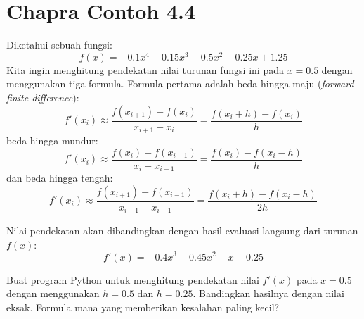 \section{Chapra Contoh 4.4}
Diketahui sebuah fungsi:
\begin{equation}
f(x) = -0.1x^4 - 0.15x^3 - 0.5x^2 - 0.25x + 1.25
\end{equation}
Kita ingin menghitung pendekatan nilai turunan fungsi ini pada $x=0.5$ dengan menggunakan tiga formula.
Formula pertama adalah beda hingga maju (\textit{forward finite difference}):
\begin{equation}
f'(x_{i}) \approx \frac{f(x_{i+1}) - f(x_{i})}{x_{i+1} - x_{i}} =
\frac{f(x_{i}+h) - f(x_{i})}{h}
\end{equation}
beda hingga mundur:
\begin{equation}
f'(x_{i}) \approx \frac{f(x_{i}) - f(x_{i-1})}{x_{i} - x_{i-1}} =
\frac{f(x_{i}) - f(x_{i}-h)}{h}
\end{equation}
dan beda hingga tengah:
\begin{equation}
f'(x_{i}) \approx \frac{f(x_{i+1}) - f(x_{i-1})}{x_{i+1} - x_{i-1}} =
\frac{f(x_{i}+h) - f(x_{i}-h)}{2h}
\end{equation}

Nilai pendekatan akan dibandingkan dengan hasil evaluasi langsung dari
turunan $f(x)$:
\begin{equation}
f'(x) = -0.4x^3 - 0.45x^2 - x - 0.25
\end{equation}

\begin{soal}
Buat program Python untuk menghitung pendekatan nilai $f'(x)$ pada $x=0.5$ dengan
menggunakan $h=0.5$ dan $h=0.25$. Bandingkan hasilnya dengan nilai eksak. Formula mana yang
memberikan kesalahan paling kecil?
\end{soal}